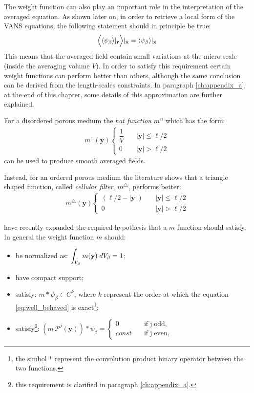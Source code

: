 The weight function can  also play an important role in the interpretation of the averaged equation. As shown later on, in order to retrieve a local form of the VANS equations, the following statement should in principle be true:
\begin{equation}
\Big\langle {\left< \psi_{\beta} \right>}|_{\mathbf{r}}  \Big\rangle  |_{\mathbf{x}} = {\left< \psi_{\beta} \right>}|_{\mathbf{x}}
\label{eq:well_behaved}
\end{equation}
This means that the averaged field contain small variations at the micro-scale (inside the averaging volume $V$).
In order to satisfy this requirement certain weight functions can perform better than others, although the same conclusion can be derived from the length-scales constraints.
In paragraph \ref{ch:appendix_a}, at the end of this chapter, some details of this approximation are further explained.

For a disordered porous medium the \textit{hat function} $m^{\sqcap}$ which has the form:
\begin{eqnarray}
	m^{\sqcap}(\mathbf{y}) 
	\begin{cases}
		\dfrac{1}{V} \quad &|\mathbf{y}| \leqslant  \ell/2\\
		0 \quad &|\mathbf{y}|>  \ell/2
	\end{cases}
\end{eqnarray}
can be used to produce smooth averaged fields.

Instead, for an ordered porous medium the literature shows that a triangle shaped function, called \textit{cellular filter}, $m^{\bigtriangleup}$,  performs better:
\begin{eqnarray}
m^{\bigtriangleup}(\mathbf{y}) 
\begin{cases}
(\ell/2 - |\mathbf{y}|) \quad &|\mathbf{y}| \leqslant \ell/2\\
0 \quad &|\mathbf{y}|>  \ell/2
\end{cases}
\end{eqnarray}

\citet{davit2017technical} have recently expanded the required hypothesis that a $m$ function should satisfy. In general the weight function $m$ should:
\begin{itemize}
	\item be normalized as: $\displaystyle\int_{V_\beta}  m(\mathbf{y}) \; dV_\beta = 1$;
	\item have compact support;
	\item satisfy: $m*\psi_{\beta} \in C^{k}$, where $k$ represent the order at which the equation \eqref{eq:well_behaved} is exact\footnote{the simbol $*$ represent the convolution product binary operator between the two functions.};
	\item satisfy\footnote{this requirement is clarified in paragraph \ref{ch:appendix_a}.}: $(m \, \mathcal{P}^j(\mathbf{y}))*\psi_{\beta} = 
	\begin{cases}
	0 \quad &\textrm{if} \; \textrm{j} \; \textrm{odd},\\
	const  \quad &\textrm{if} \; \textrm{j} \; \textrm{even},
	\end{cases}$
\end{itemize}

